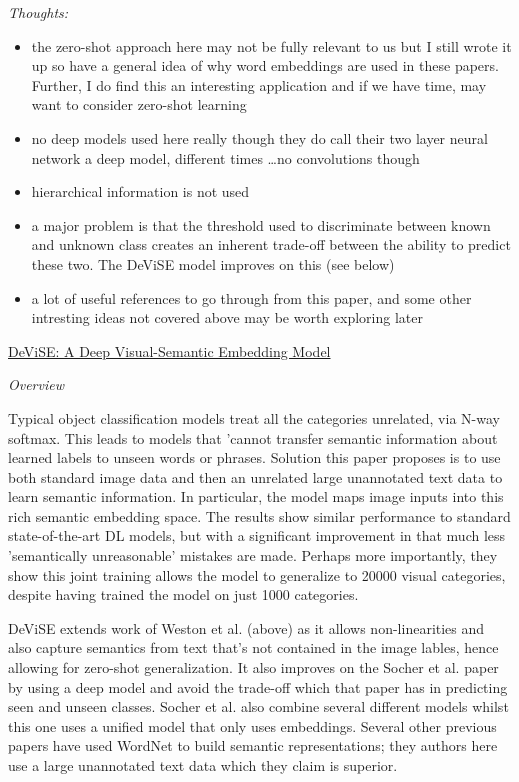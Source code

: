 \documentclass{report}
\begin{document}
\textit{Thoughts:}
\begin{itemize}
    \item the zero-shot approach here may not be fully relevant to us but I still wrote it up so have a general idea of why word embeddings are used in these papers. Further, I do find this an interesting application and if we have time, may want to consider zero-shot learning
    \item no deep models used here really though they do call their two layer neural network a deep model, different times \dots no convolutions though
    \item hierarchical information is not used
    \item a major problem is that the threshold used to discriminate between known and unknown class creates an inherent trade-off between the ability to predict these two. The DeViSE model improves on this (see below)
    \item a lot of useful references to go through from this paper, and some other intresting ideas not covered above may be worth exploring later \\
\end{itemize}

\underline{DeViSE: A Deep Visual-Semantic Embedding Model}

\textit{Overview}

Typical object classification models treat all the categories unrelated, via N-way softmax. This leads to models that 'cannot transfer semantic information about learned labels to unseen words or phrases. Solution this paper proposes is to use both standard image data and then an unrelated large unannotated text data to learn semantic information. In particular, the model maps image inputs into this rich semantic embedding space. The results show similar performance to standard state-of-the-art DL models, but with a significant improvement in that much less 'semantically unreasonable' mistakes are made. Perhaps more importantly, they show this joint training allows the model to generalize to 20000 visual categories, despite having trained the model on just 1000 categories.

DeViSE extends work of Weston et al. (above) as it allows non-linearities and also capture semantics from text that's not contained in the image lables, hence allowing for zero-shot generalization. It also improves on the Socher et al. paper by using a deep model and avoid the trade-off which that paper has in predicting seen and unseen classes. Socher et al. also combine several different models whilst this one uses a unified model that only uses embeddings. Several other previous papers have used WordNet to build semantic representations; they authors here use a large unannotated text data which they claim is superior.
\end{document}
